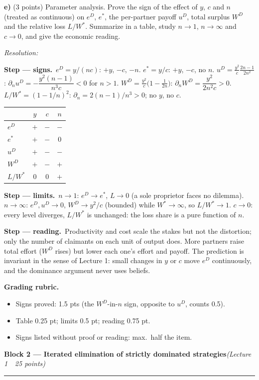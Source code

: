 \documentclass[11pt,a4paper]{article}
\newif\ifsolucoes
\newcommand{\espacoresol}{5cm}   %
\newcommand{\bloco}[3]{\bigskip\noindent
  {\large\bfseries\color{blue!55!black}Block #1 --- #2}\hfill\textit{(#3)}\par
  \noindent\rule{\linewidth}{0.3pt}\smallskip}
\newcommand{\resolespaco}{\ifsolucoes\else\par\textit{Resolution:}\vspace{\espacoresol}\par\fi}
\newcommand{\passo}[2]{\par\smallskip\noindent\textbf{Step --- #1.}~#2}
\newcommand{\rubrica}[1]{\par\smallskip\noindent\textbf{Grading rubric.}\begin{itemize}[leftmargin=1.4em,topsep=1pt]#1\end{itemize}}
\begin{document}
\textbf{e)} (3 points) Parameter analysis. Prove the sign of the effect of $y$, $c$ and $n$
(treated as continuous) on $e^D$, $e^*$, the per-partner payoff $u^D$, total surplus $W^D$ and the
relative loss $L/W^*$. Summarize in a table, study $n\to1$, $n\to\infty$ and $c\to0$, and give the
economic reading.
\resolespaco
\begin{sol}
\passo{signs}{$e^D=y/(nc)$: $+y$, $-c$, $-n$. $e^*=y/c$: $+y$, $-c$, no $n$.
$u^D=\tfrac{y^2}{c}\tfrac{2n-1}{2n^2}$: $\partial_nu^D=-\dfrac{y^2(n-1)}{n^3c}<0$ for $n>1$.
$W^D=\tfrac{y^2}{c}\big(1-\tfrac1{2n}\big)$: $\partial_nW^D=\dfrac{y^2}{2n^2c}>0$.
$L/W^*=(1-1/n)^2$: $\partial_n=2(n-1)/n^3>0$; no $y$, no $c$.}
\begin{center}
\begin{tabular}{lccc}\toprule
 & $y$ & $c$ & $n$\\\midrule
$e^D$ & $+$ & $-$ & $-$\\
$e^*$ & $+$ & $-$ & $0$\\
$u^D$ & $+$ & $-$ & $-$\\
$W^D$ & $+$ & $-$ & $+$\\
$L/W^*$ & $0$ & $0$ & $+$\\\bottomrule
\end{tabular}
\end{center}
\passo{limits}{$n\to1$: $e^D\to e^*$, $L\to0$ (a sole proprietor faces no dilemma). $n\to\infty$:
$e^D,u^D\to0$, $W^D\to y^2/c$ (bounded) while $W^*\to\infty$, so $L/W^*\to1$. $c\to0$: every level
diverges, $L/W^*$ is unchanged: the loss share is a pure function of $n$.}
\passo{reading}{Productivity and cost scale the stakes but not the distortion; only the number of
claimants on each unit of output does. More partners raise total effort ($W^D$ rises) but lower each
one's effort and payoff. The prediction is invariant in the sense of Lecture 1: small changes in
$y$ or $c$ move $e^D$ continuously, and the dominance argument never uses beliefs.}
\rubrica{
\item Signs proved: 1.5 pts (the $W^D$-in-$n$ sign, opposite to $u^D$, counts 0.5).
\item Table 0.25 pt; limits 0.5 pt; reading 0.75 pt.
\item Signs listed without proof or reading: max.\ half the item.
}
\end{sol}

\bloco{2}{Iterated elimination of strictly dominated strategies}{Lecture 1 \,\textbullet\, 25 points}
\end{document}
